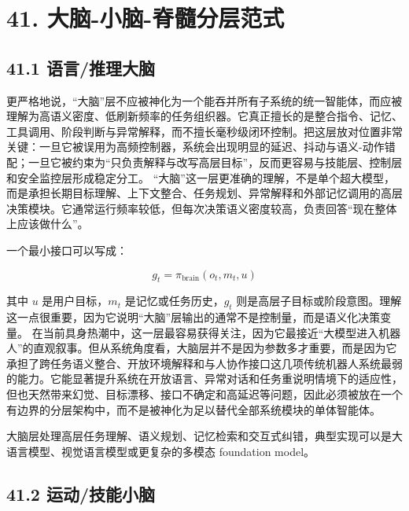 \section*{41. 大脑-小脑-脊髓分层范式}

\subsection*{41.1 语言/推理大脑}


更严格地说，“大脑”层不应被神化为一个能吞并所有子系统的统一智能体，而应被理解为高语义密度、低刷新频率的任务组织器。它真正擅长的是整合指令、记忆、工具调用、阶段判断与异常解释，而不擅长毫秒级闭环控制。把这层放对位置非常关键：一旦它被误用为高频控制器，系统会出现明显的延迟、抖动与语义-动作错配；一旦它被约束为“只负责解释与改写高层目标”，反而更容易与技能层、控制层和安全监控层形成稳定分工。 “大脑”这一层更准确的理解，不是单个超大模型，而是承担长期目标理解、上下文整合、任务规划、异常解释和外部记忆调用的高层决策模块。它通常运行频率较低，但每次决策语义密度较高，负责回答“现在整体上应该做什么”。

一个最小接口可以写成：

\begin{equation*}
g_t = \pi_{\text{brain}}(o_t, m_t, u)
\end{equation*}

其中 \(u\) 是用户目标，\(m_t\) 是记忆或任务历史，\(g_t\) 则是高层子目标或阶段意图。理解这一点很重要，因为它说明“大脑”层输出的通常不是控制量，而是语义化决策变量。 在当前具身热潮中，这一层最容易获得关注，因为它最接近“大模型进入机器人”的直观叙事。但从系统角度看，大脑层并不是因为参数多才重要，而是因为它承担了跨任务语义整合、开放环境解释和与人协作接口这几项传统机器人系统最弱的能力。它能显著提升系统在开放语言、异常对话和任务重说明情境下的适应性，但也天然带来幻觉、目标漂移、接口不确定和高延迟等问题，因此必须被放在一个有边界的分层架构中，而不是被神化为足以替代全部系统模块的单体智能体。

大脑层处理高层任务理解、语义规划、记忆检索和交互式纠错，典型实现可以是大语言模型、视觉语言模型或更复杂的多模态 foundation model。

\subsection*{41.2 运动/技能小脑}


